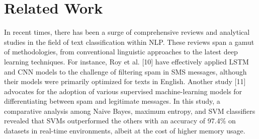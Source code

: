 \section{Related Work}
In recent times, there has been a surge of comprehensive reviews and analytical studies in the field of text classification within NLP. These reviews span a gamut of methodologies, from conventional linguistic approaches to the latest deep learning techniques. For instance, Roy et al. [10] have effectively applied LSTM and CNN models to the challenge of filtering spam in SMS messages, although their models were primarily optimized for texts in English. Another study [11] advocates for the adoption of various supervised machine-learning models for differentiating between spam and legitimate messages. In this study, a comparative analysis among Naive Bayes, maximum entropy, and SVM classifiers revealed that SVMs outperformed the others with an accuracy of 97.4\% on datasets in real-time environments, albeit at the cost of higher memory usage.

